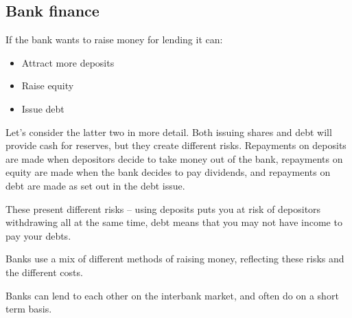 
\subsection{Bank finance}

If the bank wants to raise money for lending it can:

\begin{itemize}
\item Attract more deposits
\item Raise equity
\item Issue debt
\end{itemize}

Let’s consider the latter two in more detail. Both issuing shares and debt will provide cash for reserves, but they create different risks. Repayments on deposits are made when depositors decide to take money out of the bank, repayments on equity are made when the bank decides to pay dividends, and repayments on debt are made as set out in the debt issue.

These present different risks – using deposits puts you at risk of depositors withdrawing all at the same time, debt means that you may not have income to pay your debts.

Banks use a mix of different methods of raising money, reflecting these risks and the different costs.

Banks can lend to each other on the interbank market, and often do on a short term basis.

